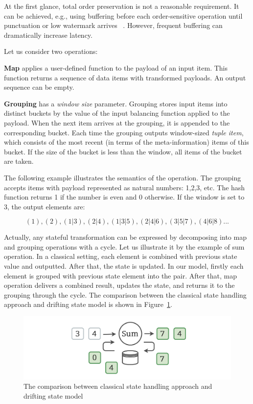 At the first glance, total order preservation is not a reasonable requirement. It can be achieved, e.g., using buffering before each order-sensitive operation until punctuation or low watermark arrives ~\cite{Li:2008:OPN:1453856.1453890}. However, frequent buffering can dramatically increase latency. 

Let us consider two operations:

{\bf Map} applies a user-defined function to the payload of an input item. This function returns a sequence of data items with transformed payloads. An output sequence can be empty.

{\bf Grouping} has a {\it window size} parameter. Grouping stores input items into distinct buckets by the value of the input balancing function applied to the payload. When the next item arrives at the grouping, it is appended to the corresponding bucket. Each time the grouping outputs window-sized {\it tuple item}, which consists of the most recent (in terms of the meta-information) items of this bucket. If the size of the bucket is less than the window, all items of the bucket are taken.

The following example illustrates the semantics of the operation. The grouping accepts items with payload represented as natural numbers: 1,2,3, etc. The hash function returns 1 if the number is even and 0 otherwise. If the window is set to 3, the output elements are:

\[(1), (2), (1|3), (2|4), (1|3|5), (2|4|6), (3|5|7), (4|6|8)...\]

Actually, any stateful transformation can be expressed by decomposing into map and grouping operations with a cycle. Let us illustrate it by the example of sum operation. In a classical setting, each element is combined with previous state value and outputted. After that, the state is updated. In our model, firstly each element is grouped with previous state element into the pair. After that, map operation delivers a combined result, updates the state, and returns it to the grouping through the cycle. The comparison between the classical state handling approach and drifting state model is shown in Figure~\ref{classical-drifting}.

\begin{figure}[htbp]
  \centering
  \includegraphics[width=.49\textwidth]{pics/classical-drifting}
  \caption{The comparison between classical state handling approach and drifting state model}
  \label {classical-drifting}
\end{figure}

